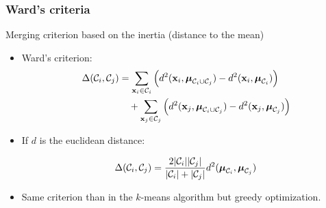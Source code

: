 \documentclass{beamer}\usepackage[]{graphicx}\usepackage[]{color}
\begin{document}
\begin{frame}
  \frametitle{Ward's criteria}
  
  \begin{block}{Merging criterion based on the inertia (distance to the mean)}
    \begin{itemize}
        \item Ward's criterion:
        \begin{align*}
          \Delta(\mathcal{C}_i, \mathcal{C}_j) 
          & = \sum_{\mathbf{x}_i \in \mathcal{C}_i} \left( d^2(\mathbf{x}_i, \boldsymbol{\mu}_{\mathcal{C}_i \cup \mathcal{C}_j} ) - d^2(\mathbf{x}_i, \boldsymbol{\mu}_{\mathcal{C}_i}) \right) \\
          & \quad + \sum_{\mathbf{x}_j \in \mathcal{C}_j} \left( d^2(\mathbf{x}_j, \boldsymbol{\mu}_{\mathcal{C}_i \cup \mathcal{C}_j} ) - d^2(\mathbf{x}_j, \boldsymbol{\mu}_{\mathcal{C}_j}) \right)
        \end{align*}
        \item If $d$ is the euclidean distance:

        \begin{align*}
          \Delta(\mathcal{C}_i, \mathcal{C}_j) = \frac{2|\mathcal{C}_i||\mathcal{C}_j|}{|\mathcal{C}_i|+|\mathcal{C}_j|}d^2(\boldsymbol{\mu}_{\mathcal{C}_i}, \boldsymbol{\mu}_{\mathcal{C}_j})
        \end{align*}
      \end{itemize}
    \end{block}
    \begin{itemize}
      \item Same criterion than in the $k$-means algorithm but greedy optimization.
    \end{itemize}
\end{frame}
\end{document}
